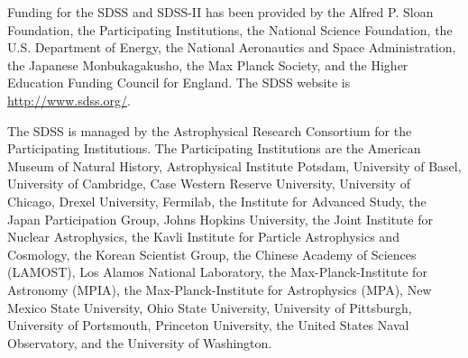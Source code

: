 \documentclass[useAMS,usenatbib]{mn2e}
\begin{document}
Funding for the SDSS and SDSS-II has been provided by the Alfred P. Sloan Foundation, the Participating Institutions, the National Science Foundation, the U.S. Department of Energy, the National Aeronautics and Space Administration, the Japanese Monbukagakusho, the Max Planck Society, and the Higher Education Funding Council for England. The SDSS website is \url{http://www.sdss.org/}.

The SDSS is managed by the Astrophysical Research Consortium for the Participating Institutions. The Participating Institutions are the American Museum of Natural History, Astrophysical Institute Potsdam, University of Basel, University of Cambridge, Case Western Reserve University, University of Chicago, Drexel University, Fermilab, the Institute for Advanced Study, the Japan Participation Group, Johns Hopkins University, the Joint Institute for Nuclear Astrophysics, the Kavli Institute for Particle Astrophysics and Cosmology, the Korean Scientist Group, the Chinese Academy of Sciences (LAMOST), Los Alamos National Laboratory, the Max-Planck-Institute for Astronomy (MPIA), the Max-Planck-Institute for Astrophysics (MPA), New Mexico State University, Ohio State University, University of Pittsburgh, University of Portsmouth, Princeton University, the United States Naval Observatory, and the University of Washington.



\end{document}
